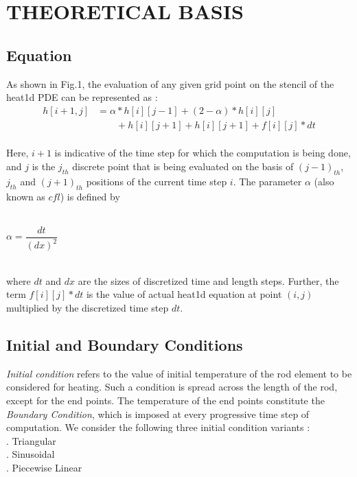 \documentclass[letterpaper, 11 pt, conference]{ieeeconf}
\begin{document}
\section{THEORETICAL BASIS}
\subsection{Equation}
As shown in Fig.1, the evaluation of any given grid point on the stencil of the heat1d PDE can be represented as :\\ 
\begin{align*}
h[i+1,j] &=\alpha*h[i][j-1] +(2-\alpha)*h[i][j] \\
&\qquad +h[i][j+1] + h[i][j+1] + f[i][j]*dt
\end{align*}
\\
Here, $i+1$ is indicative of the time step for which the computation is being done, and $j$ is the $j_{th}$ discrete point that is being evaluated on the basis of $(j-1)_{th}$, $j_{th}$ and $(j+1)_{th}$ positions of the current time step $i$. The parameter $\alpha$ (also known as $cfl$) is defined by \\\\
\centerline{$\alpha = \dfrac{dt}{(dx)^2}$}\\

where $dt$ and $dx$ are the sizes of discretized time and length steps. Further, the term $f[i][j]*dt$ is the value of actual heat1d equation at point $(i,j)$ multiplied by the discretized time step $dt$.

\subsection{Initial and Boundary Conditions }
\textit{Initial condition} refers to the value of initial temperature of the rod element to be considered for heating. Such a condition is spread across the length of the rod, except for the end points. The temperature of the end points constitute the \textit{Boundary Condition}, which is imposed at every progressive time step of computation. We consider the following three initial condition variants : \\
. Triangular \\
. Sinusoidal \\
. Piecewise Linear \\
\end{document}
